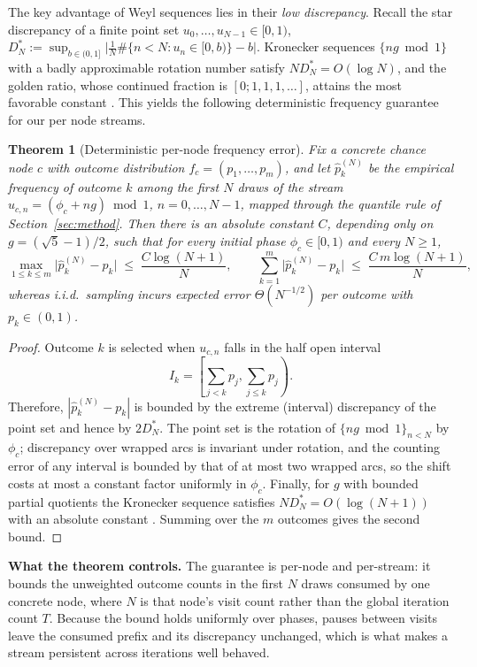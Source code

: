 \documentclass[11pt]{article}
\newtheorem{theorem}{Theorem}
\begin{document}
The key advantage of Weyl sequences lies in their \textit{low discrepancy}. Recall the star discrepancy of a finite point set $u_0,\ldots,u_{N-1}\in[0,1)$,
$D_N^* := \sup_{b\in(0,1]} \big|\tfrac{1}{N}\#\{n<N: u_n\in[0,b)\} - b\big|$.
Kronecker sequences $\{ng \bmod 1\}$ with a badly approximable rotation number satisfy $N D_N^* = O(\log N)$, and the golden ratio, whose continued fraction is $[0;1,1,1,\ldots]$, attains the most favorable constant \citep{niederreiter1992random}. This yields the following deterministic frequency guarantee for our per node streams.

\begin{theorem}[Deterministic per-node frequency error]
\label{thm:freq}
Fix a concrete chance node $c$ with outcome distribution $f_c=(p_1,\ldots,p_m)$, and let $\hat p_k^{(N)}$ be the empirical frequency of outcome $k$ among the first $N$ draws of the stream $u_{c,n}=(\phi_c+ng)\bmod 1$, $n=0,\ldots,N-1$, mapped through the quantile rule of Section~\ref{sec:method}. Then there is an absolute constant $C$, depending only on $g=(\sqrt5-1)/2$, such that for every initial phase $\phi_c\in[0,1)$ and every $N\ge 1$,
\[
\max_{1\le k\le m}\big|\hat p_k^{(N)}-p_k\big| \;\le\; \frac{C\log(N+1)}{N},
\qquad
\sum_{k=1}^m\big|\hat p_k^{(N)}-p_k\big| \;\le\; \frac{C\,m\log(N+1)}{N},
\]
whereas i.i.d.\ sampling incurs expected error $\Theta(N^{-1/2})$ per outcome with $p_k\in(0,1)$.
\end{theorem}

\begin{proof}
Outcome $k$ is selected when $u_{c,n}$ falls in the half open interval
\[
I_k=\left[\sum_{j<k}p_j,\sum_{j\le k}p_j\right).
\]
Therefore, $|\hat p_k^{(N)}-p_k|$ is bounded by the extreme (interval) discrepancy of the point set and hence by $2D_N^*$. The point set is the rotation of $\{ng\bmod 1\}_{n<N}$ by $\phi_c$; discrepancy over wrapped arcs is invariant under rotation, and the counting error of any interval is bounded by that of at most two wrapped arcs, so the shift costs at most a constant factor uniformly in $\phi_c$. Finally, for $g$ with bounded partial quotients the Kronecker sequence satisfies $N D_N^* = O(\log(N+1))$ with an absolute constant \citep{niederreiter1992random}. Summing over the $m$ outcomes gives the second bound.
\end{proof}

\textbf{What the theorem controls.} The guarantee is per-node and per-stream: it bounds the unweighted outcome counts in the first $N$ draws consumed by one concrete node, where $N$ is that node's visit count rather than the global iteration count $T$. Because the bound holds uniformly over phases, pauses between visits leave the consumed prefix and its discrepancy unchanged, which is what makes a stream persistent across iterations well behaved.
\end{document}
